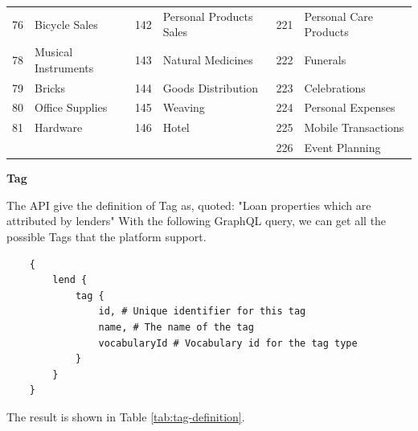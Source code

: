 \begin{longtable}[]{|r|l|r|l|r|l|}
	76                                & Bicycle Sales                      & 142                               & Personal Products Sales            & 221                               & Personal Care
	Products                                                                                                                                                                                                                 \\
	78                                & Musical Instruments                & 143                               & Natural Medicines                  & 222                               & Funerals                           \\
	79                                & Bricks                             & 144                               & Goods Distribution                 & 223                               & Celebrations                       \\
	80                                & Office Supplies                    & 145                               & Weaving                            & 224                               & Personal Expenses                  \\
	81                                & Hardware                           & 146                               & Hotel                              & 225                               & Mobile Transactions                \\
	                                  &                                    &                                   &                                    & 226                               & Event Planning                     \\
\end{longtable}

\textbf{Tag}

The API give the definition of Tag as,
quoted: "Loan properties which are attributed by lenders"
With the following GraphQL query, we can get all the possible Tags that the platform support.

\begin{lstlisting}
    {
        lend {
            tag {
                id, # Unique identifier for this tag
                name, # The name of the tag
                vocabularyId # Vocabulary id for the tag type
            }
        }
    }
\end{lstlisting}

The result is shown in Table \ref{tab:tag-definition}.


